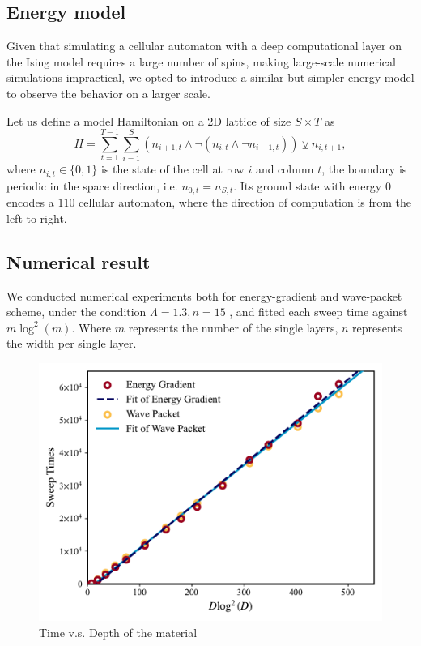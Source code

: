 \documentclass[twocolumn,superscriptaddress,english,showpacs,longbibliography]{revtex4-2}
\begin{document}
\subsection{Energy model}\label{a-2d-surface-programmable-material}

Given that simulating a cellular automaton with a deep computational layer on the Ising model requires a large number of spins, making large-scale numerical simulations impractical, we opted to introduce a similar but simpler energy model to observe the behavior on a larger scale.

Let us define a model Hamiltonian on a 2D lattice of size $S \times T$ as
\begin{equation}\label{eq:toy-hamiltonian}
H = \sum_{t=1}^{T-1}\sum_{i=1}^{S} (n_{i+1, t} \land \neg(n_{i, t} \land \neg n_{i-1, t})) \veebar n_{i,t+1},
\end{equation}
where $n_{i, t} \in \{0, 1\}$ is the state of the cell at row $i$ and column $t$, the boundary is periodic in the space direction, i.e. $n_{0, t} = n_{S, t}$.
Its ground state with energy $0$ encodes a $110$ cellular automaton, where the direction of computation is from the left to right.
\subsection{Numerical result}


We conducted numerical experiments both for energy-gradient and wave-packet scheme, under the condition
$\Lambda = 1.3, n = 15$ , and fitted each sweep time against
$m \log^2(m)$. Where $m$ represents the number of the single layers,
$n$ represents the width per single layer.

\begin{figure}[h]
    \centering
    \includegraphics[width=\columnwidth,keepaspectratio]{../notes/images/numercial result.pdf}
    \caption{Time v.s. Depth of the material}
\end{figure}
\end{document}
